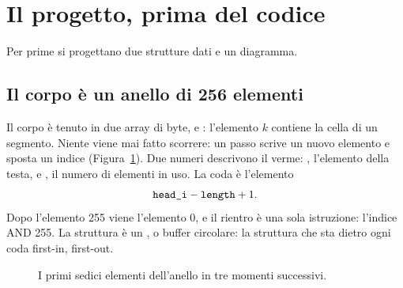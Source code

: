\section{Il progetto, prima del codice}

Per prime si progettano due strutture dati e un diagramma.

\subsection{Il corpo è un anello di 256 elementi}

Il corpo è tenuto in due array di byte,  e :
l'elemento $k$ contiene la cella di un segmento. Niente viene mai fatto
scorrere: un passo scrive un nuovo elemento e sposta un indice
(Figura~\ref{fig:v3:ring}). Due numeri descrivono il verme: ,
l'elemento della testa, e , il numero di elementi in uso. La coda
è l'elemento
\[ \texttt{head\_i}-\texttt{length}+1 . \]
Dopo l'elemento 255 viene l'elemento 0, e il rientro è una sola istruzione:
l'indice AND 255. La struttura è un , o buffer circolare: la
struttura che sta dietro ogni coda first-in, first-out.

\begin{figure}[htb]
\centering
{}
\caption{I primi sedici elementi dell'anello in tre momenti successivi.}
\label{fig:v3:ring}
\end{figure}

